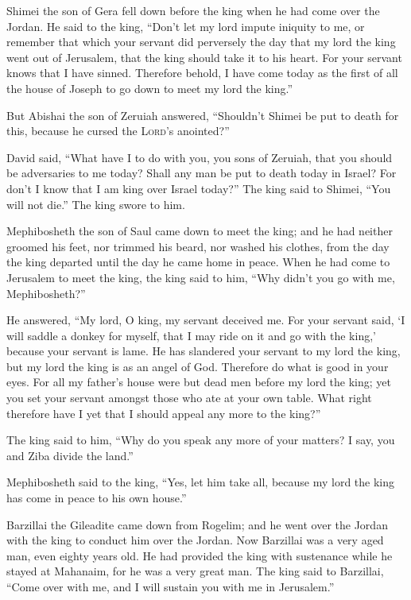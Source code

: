 Shimei the son of Gera fell down before the king when he had come over
the Jordan.  He said to the king, ``Don't let my lord
impute iniquity to me, or remember that which your servant did
perversely the day that my lord the king went out of Jerusalem, that the
king should take it to his heart.  For your servant knows
that I have sinned. Therefore behold, I have come today as the first of
all the house of Joseph to go down to meet my lord the king.''

 But Abishai the son of Zeruiah answered, ``Shouldn't
Shimei be put to death for this, because he cursed the \textsc{Lord}'s
anointed?''

 David said, ``What have I to do with you, you sons of
Zeruiah, that you should be adversaries to me today? Shall any man be
put to death today in Israel? For don't I know that I am king over
Israel today?''  The king said to Shimei, ``You will not
die.'' The king swore to him.

 Mephibosheth the son of Saul came down to meet the king;
and he had neither groomed his feet, nor trimmed his beard, nor washed
his clothes, from the day the king departed until the day he came home
in peace.  When he had come to Jerusalem to meet the
king, the king said to him, ``Why didn't you go with me, Mephibosheth?''

 He answered, ``My lord, O king, my servant deceived me.
For your servant said, `I will saddle a donkey for myself, that I may
ride on it and go with the king,' because your servant is lame.
 He has slandered your servant to my lord the king, but
my lord the king is as an angel of God. Therefore do what is good in
your eyes.  For all my father's house were but dead men
before my lord the king; yet you set your servant amongst those who ate
at your own table. What right therefore have I yet that I should appeal
any more to the king?''

 The king said to him, ``Why do you speak any more of
your matters? I say, you and Ziba divide the land.''

 Mephibosheth said to the king, ``Yes, let him take all,
because my lord the king has come in peace to his own house.''

 Barzillai the Gileadite came down from Rogelim; and he
went over the Jordan with the king to conduct him over the Jordan.
 Now Barzillai was a very aged man, even eighty years
old. He had provided the king with sustenance while he stayed at
Mahanaim, for he was a very great man.  The king said to
Barzillai, ``Come over with me, and I will sustain you with me in
Jerusalem.''

